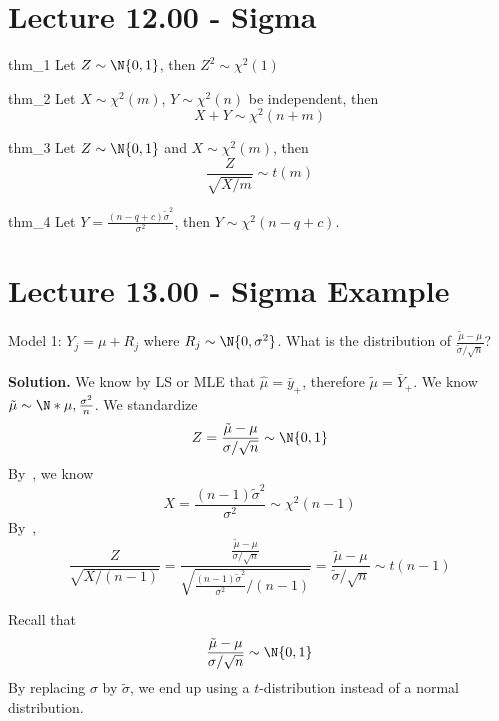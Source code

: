 \section{Lecture 12.00 - Sigma}
\begin{Theorem}{}{thm_1}
    Let $ Z \sim \N{0,1} $, then $ Z^2 \sim \chi^2(1) $
\end{Theorem}
\begin{Theorem}{}{thm_2}
    Let $ X \sim \chi^2(m) $, $ Y \sim \chi^2(n) $
    be independent, then
    \[ X+Y \sim \chi^2(n+m) \]
\end{Theorem}
\begin{Theorem}{}{thm_3}
    Let $ Z \sim \N{0,1} $ and $ X \sim \chi^2(m) $, then
    \[ \frac{Z}{\sqrt{X/m}} \sim t(m) \]
\end{Theorem}
\begin{Theorem}{}{thm_4}
    Let $ \displaystyle Y=\frac{(n-q+c)\tilde{\sigma}^2}{\sigma^2} $,
    then $ Y \sim \chi^2(n-q+c) $.
\end{Theorem}
\section{Lecture 13.00 - Sigma Example}
\begin{Example}{}{}
    Model 1: $ Y_j=\mu+R_j $ where $ R_j \sim \N{0,\sigma^2} $.
    What is the distribution of $ \displaystyle \frac{\tilde{\mu}-\mu}{\tilde{\sigma}/\sqrt{n}} $?

    \textbf{Solution.} We know by LS or MLE that $ \hat{\mu}=\bar{y}_+ $, therefore
    $ \tilde{\mu}=\bar{Y}_+ $. We know $ \tilde{\mu} \sim \N*{\mu,\frac{\sigma^2}{n}} $.
    We standardize
    \[ Z=\frac{\tilde{\mu}-\mu}{\sigma/\sqrt{n}}\sim \N{0,1}  \]
    By~, we know
    \[ X=\frac{(n-1)\tilde{\sigma}^2}{\sigma^2}\sim \chi^2(n-1)  \]
    By~,
    \[ \frac{Z}{\sqrt{X/(n-1)}}
        =\frac{\displaystyle \frac{\tilde{\mu}-\mu}{\sigma/\sqrt{n}}}{\displaystyle \sqrt{\frac{(n-1)\tilde{\sigma}^2}{\sigma^2}\bigg/(n-1)}}
        =\frac{\tilde{\mu}-\mu}{\tilde{\sigma}/\sqrt{n}}\sim t(n-1)   \]
\end{Example}
\begin{Remark}{}{}
    Recall that
    \[ \frac{\tilde{\mu}-\mu}{\sigma/\sqrt{n}}\sim \N{0,1}  \]
    By replacing $ \sigma $ by $ \tilde{\sigma} $, we end up using a $ t $-distribution
    instead of a normal distribution.
\end{Remark}
